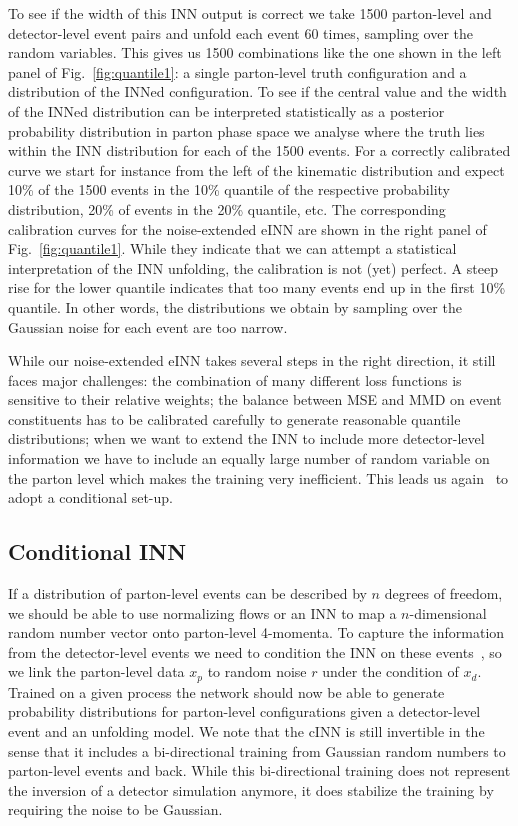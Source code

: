 To see if the width of this INN output is correct we take 1500
parton-level and detector-level event pairs and unfold each event 60
times, sampling over the random variables. This gives us 1500
combinations like the one shown in the left panel of
Fig.~\ref{fig:quantile1}: a single parton-level truth configuration
and a distribution of the INNed configuration. To see if the central
value and the width of the INNed distribution can be interpreted
statistically as a posterior probability distribution in parton phase
space we analyse where the truth lies within the INN distribution for
each of the 1500 events.  For a correctly calibrated curve we start
for instance from the left of the kinematic distribution and expect
10\% of the 1500 events in the 10\% quantile of the respective
probability distribution, 20\% of events in the 20\% quantile, etc.
The corresponding calibration curves for the noise-extended eINN are
shown in the right panel of Fig.~\ref{fig:quantile1}. While they
indicate that we can attempt a statistical interpretation of the INN
unfolding, the calibration is not (yet) perfect.  A steep rise for the
lower quantile indicates that too many events end up in the first 10\%
quantile. In other words, the distributions we obtain by sampling over
the Gaussian noise for each event are too narrow.

While our noise-extended eINN takes several steps in the right
direction, it still faces major challenges: the combination of many
different loss functions is sensitive to their relative weights; the
balance between MSE and MMD on event constituents has to be calibrated
carefully to generate reasonable quantile distributions; when we want
to extend the INN to include more detector-level information we have
to include an equally large number of random variable on the parton
level which makes the training very inefficient. This leads us
again~\cite{fcgan} to adopt a conditional set-up.

\subsection{Conditional INN}
\label{sec:inn_cond}

If a distribution of parton-level events can be described by $n$
degrees of freedom, we should be able to use normalizing flows or an
INN to map a $n$-dimensional random number vector onto parton-level
4-momenta.  To capture the information from the detector-level events
we need to condition the INN on these
events~\cite{goodfellow,cond_gan,fcgan}, so we link the parton-level
data $x_p$ to random noise $r$ under the condition of $x_d$. Trained
on a given process the network should now be able to generate
probability distributions for parton-level configurations given a
detector-level event and an unfolding model. We note that the cINN
is still invertible in the sense that it includes a bi-directional
training from Gaussian random numbers to parton-level events and
back. While this bi-directional training does not represent the
inversion of a detector simulation anymore, it does stabilize the
training by requiring the noise to be Gaussian.

